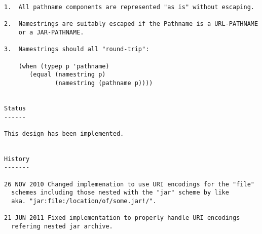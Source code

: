 \begin{verbatim}
1.  All pathname components are represented "as is" without escaping.

2.  Namestrings are suitably escaped if the Pathname is a URL-PATHNAME
    or a JAR-PATHNAME.

3.  Namestrings should all "round-trip":

    (when (typep p 'pathname)
       (equal (namestring p)
              (namestring (pathname p))))


Status
------

This design has been implemented.


History
-------

26 NOV 2010 Changed implemenation to use URI encodings for the "file"
  schemes including those nested with the "jar" scheme by like
  aka. "jar:file:/location/of/some.jar!/".

21 JUN 2011 Fixed implementation to properly handle URI encodings
  refering nested jar archive.

\end{verbatim}
